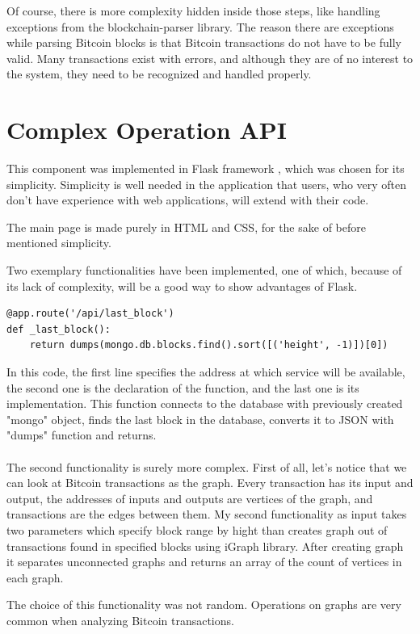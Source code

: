\documentclass[12pt, en, eng, twoside, final]{mgr}
\begin{document}
Of course, there is more complexity hidden inside those steps, like handling exceptions from the blockchain-parser library. The reason there are exceptions while parsing Bitcoin blocks is that Bitcoin transactions do not have to be fully valid. Many transactions exist with errors, and although they are of no interest to the system, they need to be recognized and handled properly.

\section{Complex Operation API}
This component was implemented in Flask framework \cite{flask-web-page}, which was chosen for its simplicity. Simplicity is well needed in the application that users, who very often don't have experience with web applications, will extend with their code. 

The main page is made purely in HTML and CSS, for the sake of before mentioned simplicity.

Two exemplary functionalities have been implemented, one of which, because of its lack of complexity, will be a good way to show advantages of Flask.
\begin{lstlisting}[caption=API returning last block in blockchain]
@app.route('/api/last_block')
def _last_block():
    return dumps(mongo.db.blocks.find().sort([('height', -1)])[0])
\end{lstlisting}
In this code, the first line specifies the address at which service will be available, the second one is the declaration of the function, and the last one is its implementation. This function connects to the database with previously created "mongo" object, finds the last block in the database, converts it to JSON with "dumps" function and returns.
\\
\\
The second functionality is surely more complex. First of all, let's notice that we can look at Bitcoin transactions as the graph. Every transaction has its input and output, the addresses of inputs and outputs are vertices of the graph, and transactions are the edges between them. My second functionality as input takes two parameters which specify block range by hight than creates graph out of transactions found in specified blocks using iGraph \cite{igraph} library. After creating graph it separates unconnected graphs and returns an array of the count of vertices in each graph.

The choice of this functionality was not random. Operations on graphs are very common when analyzing Bitcoin transactions.
\end{document}
